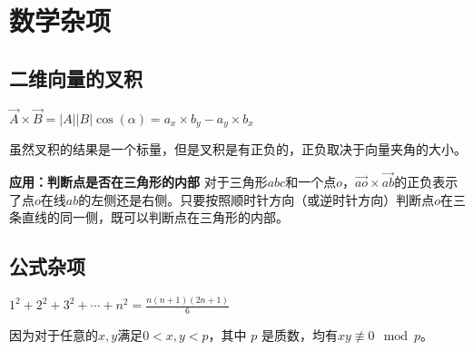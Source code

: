 \section{数学杂项}

\subsection{二维向量的叉积}
$\vec{A}\times\vec{B} = |A||B|\cos(\alpha)= a_x\times b_y-a_y\times b_x$

虽然叉积的结果是一个标量，但是叉积是有正负的，正负取决于向量夹角的大小。

\textbf{应用：判断点是否在三角形的内部}
对于三角形$abc$和一个点$o$，$\vec{ao}\times\vec{ab}$的正负表示了点$o$在线$ab$的左侧还是右侧。只要按照顺时针方向（或逆时针方向）判断点$o$在三条直线的同一侧，既可以判断点在三角形的内部。


\subsection{公式杂项}

$1^2+2^2+3^2+\cdots+n^2=\frac{n(n+1)(2n+1)}{6}$

因为对于任意的$x,y$满足$ 0 < x , y < p$，其中 $p$ 是质数，均有$xy\not\equiv0 \mod p$。

